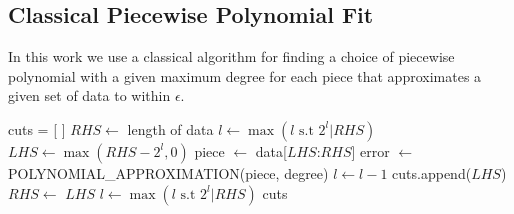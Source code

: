\documentclass{revtex4-2}
\begin{document}
\subsection{Classical Piecewise Polynomial Fit}
In this work we use a classical algorithm for finding a choice of piecewise polynomial with a given maximum degree for each piece that approximates a given set of data to within $\epsilon$.
\begin{algorithm}
\caption{Performs at most $N\log_2 N$ queries to POLYNOMIAL\_APPROXIMATION and returns the cuts between the pieces of the polynomial}\label{alg:piecewise_classical_approx}
    \begin{algorithmic}
        \State cuts = [ ]
        \State $RHS \gets $ length of data
        \State $l \gets \max (l \text{ s.t } 2^l | RHS)$
        \State $LHS \gets \max (RHS - 2^l,0)$
        \State piece $\gets$ data[$LHS$:$RHS$]
        \State error $\gets$ POLYNOMIAL\_APPROXIMATION(piece, degree)
        \State $l \gets l-1$
        \Else
        \State cuts.append($LHS$)
        \State $RHS \gets$ $LHS$
        \State $l \gets \max (l \text{ s.t } 2^l | RHS)$
        \EndIf
        \EndWhile
        \State \Return cuts
    \end{algorithmic}
\end{algorithm}


\end{document}
